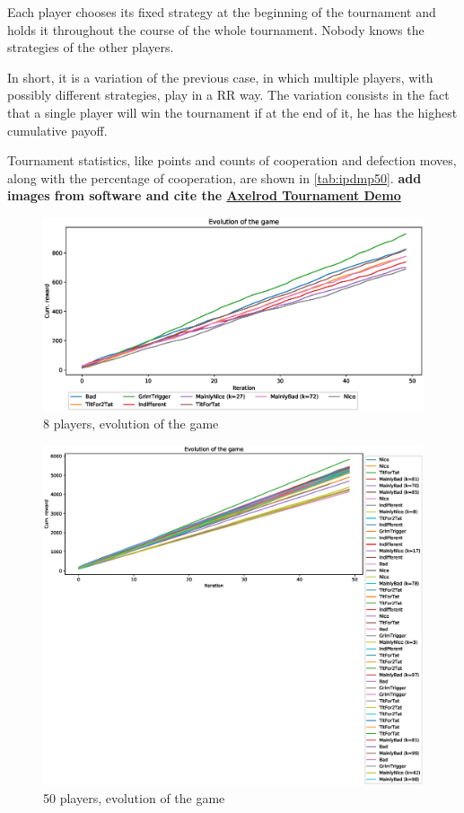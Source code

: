 \documentclass[journal,a4paper,10pt,twoside]{IEEEtran} %
\begin{document}
Each player chooses its fixed strategy at the beginning of the tournament and holds it throughout the course of the whole tournament. Nobody knows the strategies of the other players.

In short, it is a variation of the previous case, in which multiple players, with possibly different strategies, play in a RR way. The variation consists in the fact that a single player will win the tournament if at the end of it, he has the highest cumulative payoff.

Tournament statistics, like points and counts of cooperation and defection moves, along with the percentage of cooperation, are shown in \autoref{tab:ipdmp50}.
\textbf{add images from software and cite the \href{http://www2.econ.iastate.edu/tesfatsi/demos/axelrod/axelrodt.htm}{Axelrod Tournament Demo}}

\begin{figure}[!ht]
    \centering
	\includegraphics[width=1\columnwidth]{../img/ipdmp/ipdmp-evolution-of-game-8}
	\caption{8 players, evolution of the game}
	\label{fig:boxIPDMPevo8}
\end{figure}

\begin{figure}[!ht]
    \centering
    \includegraphics[width=1\columnwidth]{../img/ipdmp/ipdmp-evolution-of-game-50}
    \caption{50 players, evolution of the game}
    \label{fig:boxIPDMPevo}
\end{figure}
\end{document}
